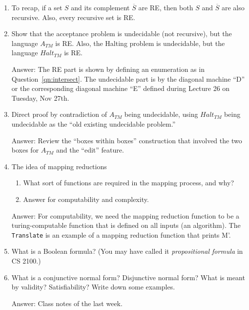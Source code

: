\documentclass[10pt]{article}
\begin{document}
\begin{enumerate}
\item[] To recap, if a set $S$ and its complement $\overline{S}$
  are RE, then both $S$ and $\overline{S}$ are also recursive.
  Also, every
  recursive set is RE.


\item Show that the
  acceptance problem is undecidable (not recursive), but the language
    $A_{TM}$ is RE.
  Also, the
  Halting problem is undecidable, but the language
  $Halt_{TM}$ is RE.
  \begin{sf}
    Answer:
    The RE part is shown by defining an enumeration
    as in Question~\ref{qn:intersect}.
    The undecidable part is by the diagonal machine ``D'' or the
    corresponding diagonal machine ``E'' defined
    during Lecture 26 on Tuesday, Nov 27th.
  \end{sf}

\item Direct proof by contradiction of $A_{TM}$ being undecidable, using
  $Halt_{TM}$ being undecidable as the ``old existing undecidable problem.''
  \begin{sf}
    Answer:
    Review the ``boxes within boxes'' construction that involved
    the two boxes for $A_{TM}$ and the ``edit'' feature.
  \end{sf}

  
\item The idea of mapping reductions
  \begin{enumerate}
  \item What sort of functions are required in the mapping process, and why?
  \item Answer for computability and complexity.
  \end{enumerate}
  \begin{sf}
    Answer:
    For computability, we need the mapping reduction function
    to be a turing-computable function that is defined on all inputs
    (an algorithm). The {\tt Translate} is an example of a mapping
    reduction function that prints M'.
  \end{sf}

\item What is a Boolean formula? (You may have called it {\em propositional
  formula} in CS 2100.)

\item What is a conjunctive normal form? Disjunctive normal form?
  What is meant by validity? Satisfiability?  
  Write down some examples.
  \begin{sf}
    Answer: Class notes of the last week.
  \end{sf}


\end{enumerate}
\end{document}
